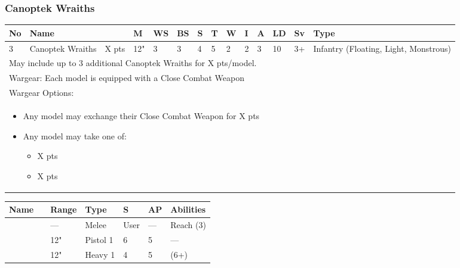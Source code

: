 \newpage
\subsubsection{Canoptek Wraiths}

\noindent
\begin{tabular}{||m{10pt} m{95pt} m{30pt} m{11pt} m{11pt} m{11pt} m{11pt} m{11pt} m{11pt} m{11pt} m{11pt} m{11pt} m{11pt} m{125pt}||}
	\hline
	No & Name & & M & WS & BS & S & T & W & I & A & LD & Sv & Type \\
	\hline
	3 & Canoptek Wraiths & X pts & 12" & 3 & 3 & 4 & 5 & 2 & 2 & 3 & 10 & 3+ & Infantry (Floating, Light, Monstrous)\\
	\hline
	\hline
	\multicolumn{14}{||Z{532 pt}||}{May include up to 3 additional Canoptek Wraiths for X pts/model.}\\		
	\hline
	\hline
	\multicolumn{14}{||Z{532 pt}||}{Wargear: Each model is equipped with a Close Combat Weapon}\\
	\multicolumn{14}{||Z{532 pt}||}{Wargear Options:} \\	\multicolumn{14}{||Z{532 pt}||}{\begin{itemize}
			\item Any model may exchange their Close Combat Weapon for \quickref{Whip Coils} \hrulefill X pts
			\item Any model may take one of:
			\begin{itemize}
				\item \quickref{Particle Caster} \hrulefill X pts
				\item \quickref{Transdimensional Beamer} \hrulefill X pts
			\end{itemize}
	\end{itemize}} \\
	\hline
\end{tabular}

\noindent
\begin{tabular}{||m{110pt} m{30pt} m{31pt} m{55pt} m{12pt} m{12pt} m{210pt}||}
	\hline
	Name & & Range & Type & S & AP & Abilities \\
	\hline
	\quickref{Whip Coils} & & — & Melee & User & — & Reach (3) \\
	\quickref{Particle Caster} & & 12" & Pistol 1 & 6 & 5 & — \\
	\quickref{Transdimensional Beamer} & & 12" & Heavy 1 & 4 & 5 & \quickref{Exile Ray} (6+) \\
	\hline
\end{tabular}

